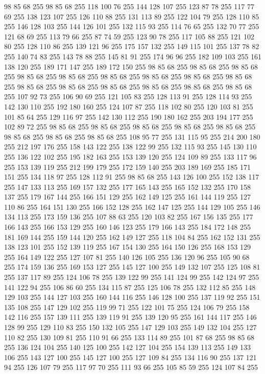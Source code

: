 98 85 68 255 98 85 68 255 118 100 76 255 144 128 107 255 123 87 78 255 117 77 69 255 138 123 107 255 126 110 88 255 131 113 89 255 122 104 79 255 128 110 85 255 146 128 103 255 144 126 101 255 132 115 93 255 114 76 65 255 132 70 77 255 121 68 69 255 113 79 66 255 87 74 59 255 123 90 78 255 117 105 88 255 121 102 80 255 128 110 86 255 139 121 96 255 175 157 132 255 149 115 101 255 137 78 82 255 140 74 83 255 143 78 88 255 145 81 91 255 174 96 96 255 182 109 103 255 161 138 120 255 189 171 147 255 189 172 150 255 98 85 68 255 98 85 68 255 98 85 68 255 98 85 68 255 98 85 68 255 98 85 68 255 98 85 68 255 98 85 68 255 98 85 68 255 98 85 68 255 98 85 68 255 98 85 68 255 98 85 68 255 98 85 68 255 98 85 68 255 107 92 73 255 106 90 69 255 121 105 83 255 128 113 91 255 128 114 93 255 142 130 110 255 192 180 160 255 124 107 87 255 118 102 80 255 120 103 81 255 101 85 64 255 129 116 97 255 142 130 112 255 190 180 162 255
203 194 177 255 102 89 72 255 98 85 68 255 98 85 68 255 98 85 68 255 98 85 68 255 98 85 68 255 98 85 68 255 98 85 68 255 98 85 68 255 108 95 77 255 131 115 95 255 214 200 180 255 212 197 176 255 158 143 122 255 138 122 99 255 132 115 93 255 145 130 110 255 136 122 102 255 195 182 163 255 153 139 120 255 124 109 89 255 133 117 96 255 153 139 119 255 212 199 179 255 172 159 140 255 203 189 169 255 185 171 151 255 134 118 97 255 128 112 91 255 98 85 68 255 143 126 100 255 152 138 117 255 147 133 113 255 169 157 132 255 177 165 143 255 165 152 132 255 170 158 137 255 179 167 144 255 166 151 129 255 162 149 125 255 161 144 119 255 127 110 86 255 164 151 130 255 166 152 128 255 162 147 125 255 144 129 105 255 146 134 113 255 173 159 136 255 107 88 63 255 120 103 82 255 167 156 135 255 177 166 143 255 166 153 129 255 160 146 123 255 179 166 143 255 184 172 148 255 181 169 144 255 159 144 120 255 162 149 127 255 118 104 84 255 162 152 131 255 138 123 101 255 152 139 119 255
167 154 130 255 164 150 126 255 168 153 129 255 164 149 122 255 127 107 81 255 140 126 105 255 136 120 96 255 105 90 68 255 174 159 136 255 169 153 127 255 145 127 100 255 149 132 107 255 125 108 81 255 137 117 89 255 124 106 78 255 139 122 99 255 141 124 99 255 142 124 97 255 141 122 94 255 106 86 60 255 134 115 87 255 125 106 78 255 132 112 85 255 148 129 103 255 144 127 103 255 160 144 116 255 146 128 100 255 137 119 92 255 151 135 108 255 147 129 102 255 119 99 71 255 122 101 75 255 124 106 79 255 158 142 116 255 157 139 111 255 139 119 91 255 139 120 95 255 161 144 117 255 146 128 99 255 129 110 83 255 150 132 105 255 147 129 103 255 149 132 104 255 127 110 82 255 130 109 81 255 110 91 66 255 133 114 89 255 101 87 68 255 98 85 68 255 136 124 104 255 140 125 100 255 142 127 104 255 154 139 113 255 149 133 106 255 143 127 100 255 145 127 100 255 127 109 84 255 134 116 90 255 137 121 94 255 126 107 79 255 117 97 70 255 111 93 66 255 105 85 59 255 124 107 84 255
